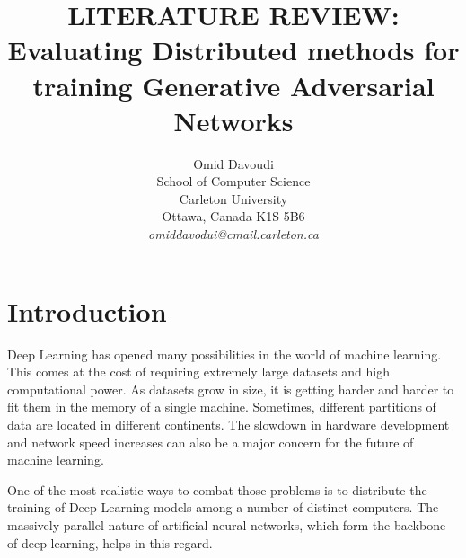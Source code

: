 \documentclass[11pt]{article}       %
\begin{document}


\title{LITERATURE REVIEW: Evaluating Distributed methods for training Generative Adversarial Networks}


\author{
Omid Davoudi\\
School of Computer Science\\
Carleton University\\
Ottawa, Canada K1S 5B6\\
{\em omiddavodui@cmail.carleton.ca}
} %

\maketitle



\section{Introduction} \label{intro}

Deep Learning has opened many possibilities in the world of machine learning. This comes at the cost of requiring extremely large datasets and high computational power. As datasets grow in size, it is getting harder and harder to fit them in the memory of a single machine. Sometimes, different partitions of data are located in different continents. The slowdown in hardware development and network speed increases can also be a major concern for the future of machine learning.

One of the most realistic ways to combat those problems is to distribute the training of Deep Learning models among a number of distinct computers. The massively parallel nature of artificial neural networks, which form the backbone of deep learning, helps in this regard.
\end{document}
